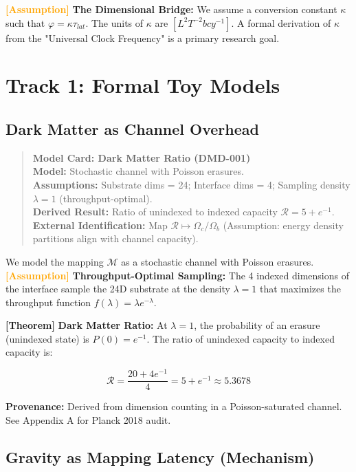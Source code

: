 \documentclass[11pt,titlepage]{article}
\newcommand{\tagass}{\textcolor{orange}{\textbf{[Assumption]}} }
\newcommand{\tagtheo}{\textcolor{green!60!black}{\textbf{[Theorem]}} }
\begin{document}
\tagass \textbf{The Dimensional Bridge:} We assume a conversion constant $\kappa$ such that $\varphi = \kappa \tau_{lat}$. The units of $\kappa$ are $[L^2 T^{-2} b cy^{-1}]$. A formal derivation of $\kappa$ from the "Universal Clock Frequency" is a primary research goal.

\section{Track 1: Formal Toy Models}

\subsection{Dark Matter as Channel Overhead}
\begin{quote}
\textbf{Model Card: Dark Matter Ratio (DMD-001)} \\
\textbf{Model:} Stochastic channel with Poisson erasures. \\
\textbf{Assumptions:} Substrate dims = 24; Interface dims = 4; Sampling density $\lambda=1$ (throughput-optimal). \\
\textbf{Derived Result:} Ratio of unindexed to indexed capacity $\mathcal{R} = 5 + e^{-1}$. \\
\textbf{External Identification:} Map $\mathcal{R} \mapsto \Omega_c/\Omega_b$ (Assumption: energy density partitions align with channel capacity).
\end{quote}

We model the mapping $\mathcal{M}$ as a stochastic channel with Poisson erasures.
\tagass \textbf{Throughput-Optimal Sampling:} The 4 indexed dimensions of the interface sample the 24D substrate at the density $\lambda=1$ that maximizes the throughput function $f(\lambda) = \lambda e^{-\lambda}$.

\tagtheo \textbf{Dark Matter Ratio:} At $\lambda=1$, the probability of an erasure (unindexed state) is $P(0) = e^{-1}$. The ratio of unindexed capacity to indexed capacity is:

\begin{equation}
\mathcal{R} = \frac{20 + 4e^{-1}}{4} = 5 + e^{-1} \approx 5.3678
\end{equation}

\textbf{Provenance:} Derived from dimension counting in a Poisson-saturated channel. See Appendix A for Planck 2018 audit.

\subsection{Gravity as Mapping Latency (Mechanism)}
\end{document}
